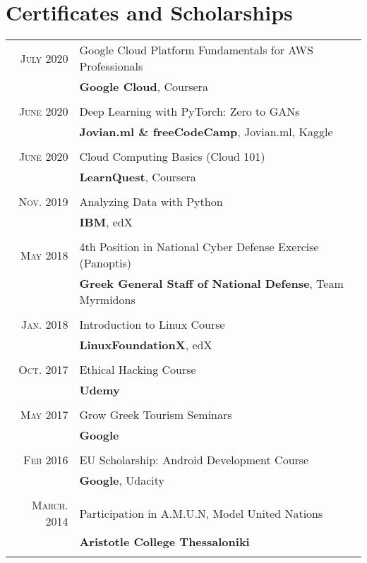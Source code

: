 \documentclass[a4paper,10pt]{article}
\begin{document}
\section{Certificates and Scholarships}
\begin{tabular}{rl}
    \textsc{July} 2020 & Google Cloud Platform Fundamentals for AWS Professionals \\& \textbf{Google Cloud}, Coursera \\ \\ 
    \textsc{June} 2020 & Deep Learning with PyTorch: Zero to GANs \\& \textbf{Jovian.ml \& freeCodeCamp}, Jovian.ml, Kaggle \\ \\
    \textsc{June} 2020 & Cloud Computing Basics (Cloud 101) \\& \textbf{LearnQuest}, Coursera \\ \\
    \textsc{Nov.} 2019 & Analyzing Data with Python \\& \textbf{IBM}, edX \\ \\
    \textsc{May} 2018 & 4th Position in National Cyber Defense Exercise (Panoptis)  \\& \textbf{Greek General Staff of National Defense}, Team Myrmidons \\ \\
    \textsc{Jan.} 2018 & Introduction to Linux Course\\& \textbf{LinuxFoundationX}, edX \\ \\
    \textsc{Oct.} 2017 & Ethical Hacking Course \\& \textbf{Udemy} \\ \\
    \textsc{May} 2017 & Grow Greek Tourism Seminars \\& \textbf{Google} \\ \\ 
    \textsc{Feb} 2016 & EU Scholarship: Android Development Course \\& \textbf{Google}, Udacity \\ \\
    \textsc{March.} 2014 & Participation in A.M.U.N, Model United Nations \\& \textbf{Aristotle College Thessaloniki} \\ \\ 

\end{tabular}
\end{document}
